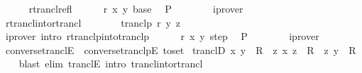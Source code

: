 \begin{isabellebody}
\ \ \ \ \isamarkupfalse%
\ rtrancl{\isacharunderscore}{\kern0pt}refl\isanewline
\ \ \ \ \isamarkupfalse%
\ {\isacartoucheopen}r\ x\ y{\isacartoucheclose}\ base\ \isamarkupfalse%
\ P\isanewline
\ \ \ \ \ \ \isamarkupfalse%
\ iprover\isanewline
\ \ \isamarkupfalse%
\isanewline
\ \ \ \ \isamarkupfalse%
\ rtrancl{\isacharunderscore}{\kern0pt}into{\isacharunderscore}{\kern0pt}rtrancl\isanewline
\ \ \ \ \isamarkupfalse%
\ \isamarkupfalse%
\ {\isachardoublequoteopen}tranclp\ r\ y\ z{\isachardoublequoteclose}\isanewline
\ \ \ \ \ \ \isamarkupfalse%
\ {\isacharparenleft}{\kern0pt}iprover\ intro{\isacharcolon}{\kern0pt}\ rtranclp{\isacharunderscore}{\kern0pt}into{\isacharunderscore}{\kern0pt}tranclp{}{\isacharparenright}{\kern0pt}\isanewline
\ \ \ \ \isamarkupfalse%
\ {\isacartoucheopen}r\ x\ y{\isacartoucheclose}\ step\ \isamarkupfalse%
\ P\isanewline
\ \ \ \ \ \ \isamarkupfalse%
\ iprover\isanewline
\ \ \isamarkupfalse%
\isanewline
{}\isamarkupfalse%
%
\endisatagproof
{\isafoldproof}%
%
\isadelimproof
\isanewline
%
\endisadelimproof
\isanewline
{}\isamarkupfalse%
\ converse{\isacharunderscore}{\kern0pt}tranclE\ {\isacharequal}{\kern0pt}\ converse{\isacharunderscore}{\kern0pt}tranclpE\ {\isacharbrackleft}{\kern0pt}to{\isacharunderscore}{\kern0pt}set{\isacharbrackright}{\kern0pt}\isanewline
\isanewline
{}\isamarkupfalse%
\ tranclD{}{\isacharcolon}{\kern0pt}\ {\isachardoublequoteopen}{\isacharparenleft}{\kern0pt}x{\isacharcomma}{\kern0pt}\ y{\isacharparenright}{\kern0pt}\ {\isasymin}\ R\isactrlsup {\isacharplus}{\kern0pt}\ {\isasymLongrightarrow}\ {\isasymexists}z{\isachardot}{\kern0pt}\ {\isacharparenleft}{\kern0pt}x{\isacharcomma}{\kern0pt}\ z{\isacharparenright}{\kern0pt}\ {\isasymin}\ R\isactrlsup {\isacharasterisk}{\kern0pt}\ {\isasymand}\ {\isacharparenleft}{\kern0pt}z{\isacharcomma}{\kern0pt}\ y{\isacharparenright}{\kern0pt}\ {\isasymin}\ R{\isachardoublequoteclose}\isanewline
%
\isadelimproof
\ \ %
\endisadelimproof
%
\isatagproof
{}\isamarkupfalse%
\ {\isacharparenleft}{\kern0pt}blast\ elim{\isacharcolon}{\kern0pt}\ tranclE\ intro{\isacharcolon}{\kern0pt}\ trancl{\isacharunderscore}{\kern0pt}into{\isacharunderscore}{\kern0pt}rtrancl{\isacharparenright}{\kern0pt}%
\endisatagproof
{\isafoldproof}%
%
\isadelimproof
\isanewline
%
\endisadelimproof
\isanewline
{}\isamarkupfalse%

\end{isabellebody}
